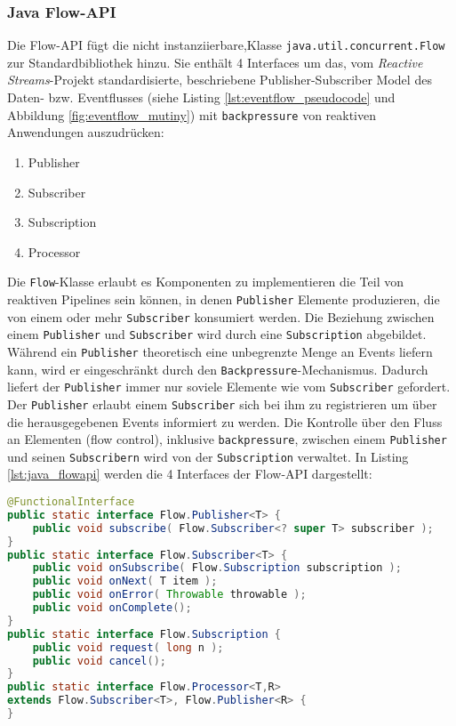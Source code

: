 \subsubsection{Java Flow-API}
\label{subsection:java_flow_api}
Die Flow-API fügt die nicht instanziierbare,Klasse \verb|java.util.concurrent.Flow| zur Standardbibliothek hinzu. Sie enthält 4 Interfaces um das,
vom \textit{Reactive Streams}-Projekt standardisierte, beschriebene Publisher-Subscriber Model des Daten- bzw. Eventflusses
(siehe Listing \ref{lst:eventflow_pseudocode} und Abbildung \ref{fig:eventflow_mutiny}) mit \verb|backpressure|
von reaktiven Anwendungen auszudrücken:
\begin{enumerate}
    \item Publisher
    \item Subscriber
    \item Subscription
    \item Processor
\end{enumerate}

Die \verb|Flow|-Klasse erlaubt es Komponenten zu implementieren die Teil von reaktiven Pipelines sein können, in denen
\verb|Publisher| Elemente produzieren, die von einem oder mehr \verb|Subscriber| konsumiert werden. Die Beziehung zwischen einem
\verb|Publisher| und \verb|Subscriber| wird durch eine \verb|Subscription| abgebildet.
Während ein \verb|Publisher| theoretisch eine unbegrenzte Menge an Events liefern kann, wird er eingeschränkt durch den
\verb|Backpressure|-Mechanismus. Dadurch liefert der \verb|Publisher| immer nur soviele Elemente wie vom \verb|Subscriber| gefordert.
Der \verb|Publisher| erlaubt einem \verb|Subscriber| sich bei ihm zu registrieren um über die herausgegebenen Events informiert zu werden.
Die Kontrolle über den Fluss an Elementen (flow control), inklusive \verb|backpressure|, zwischen einem \verb|Publisher| und seinen \verb|Subscribern|
wird von der \verb|Subscription| verwaltet.
In Listing \ref{lst:java_flowapi} werden die 4 Interfaces der Flow-API dargestellt:
\begin{lstlisting}[language=java, caption=Die Klasse java.util.concurrent.Flow, captionpos=b, label=lst:java_flowapi]
@FunctionalInterface
public static interface Flow.Publisher<T> {
	public void subscribe( Flow.Subscriber<? super T> subscriber );
}
public static interface Flow.Subscriber<T> {
	public void onSubscribe( Flow.Subscription subscription );
	public void onNext( T item );
	public void onError( Throwable throwable );
	public void onComplete();
}
public static interface Flow.Subscription {
	public void request( long n );
	public void cancel();
}
public static interface Flow.Processor<T,R>
extends Flow.Subscriber<T>, Flow.Publisher<R> {
}
\end{lstlisting}\parencite[Kapitel 5.11]{JavaSE9StandardBibliothek}

